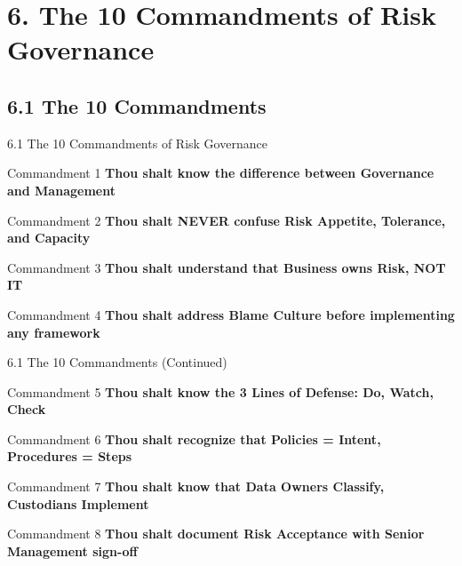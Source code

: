 \documentclass[10pt]{beamer}  %
\begin{document}
	\section{6. The 10 Commandments of Risk Governance}
	
	\subsection{6.1 The 10 Commandments}
	\begin{frame}{6.1 The 10 Commandments of Risk Governance}
		\begin{block}{Commandment 1}
			\centering
			\textbf{Thou shalt know the difference between Governance and Management}
		\end{block}
		
		\begin{block}{Commandment 2}
			\centering
			\textbf{Thou shalt NEVER confuse Risk Appetite, Tolerance, and Capacity}
		\end{block}
		
		\begin{block}{Commandment 3}
			\centering
			\textbf{Thou shalt understand that Business owns Risk, NOT IT}
		\end{block}
		
		\begin{block}{Commandment 4}
			\centering
			\textbf{Thou shalt address Blame Culture before implementing any framework}
		\end{block}
	\end{frame}
	
	\begin{frame}{6.1 The 10 Commandments (Continued)}
		\begin{block}{Commandment 5}
			\centering
			\textbf{Thou shalt know the 3 Lines of Defense: Do, Watch, Check}
		\end{block}
		
		\begin{block}{Commandment 6}
			\centering
			\textbf{Thou shalt recognize that Policies = Intent, Procedures = Steps}
		\end{block}
		
		\begin{block}{Commandment 7}
			\centering
			\textbf{Thou shalt know that Data Owners Classify, Custodians Implement}
		\end{block}
		
		\begin{block}{Commandment 8}
			\centering
			\textbf{Thou shalt document Risk Acceptance with Senior Management sign-off}
		\end{block}
	\end{frame}
	
\end{document}
